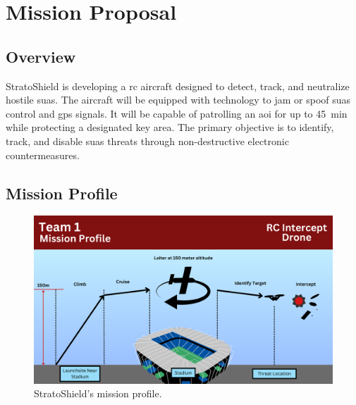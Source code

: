 \chapter{Mission Proposal}\label{cp:mission_proposal}

\section{Overview}

StratoShield is developing a \acrfull{rc} aircraft designed to detect, track, and neutralize hostile \acrshort{suas}. The aircraft will be equipped with technology to jam or spoof \acrshort{suas} control and \acrfull{gps} signals. It will be capable of patrolling an \acrfull{aoi} for up to \qty{45}{\minute} while protecting a designated key area. The primary objective is to identify, track, and disable \acrshort{suas} threats through non-destructive electronic countermeasures.

\section{Mission Profile}

\begin{figure}[htpb]
    \centering
    \includegraphics[width=\linewidth]{Figures/AERE 4610 Team 1 Mission Profile v1.0.0.pdf}
    \caption[StratoShield mission profile]{StratoShield's mission profile.}
    \label{fig:mission_profile}
\end{figure}